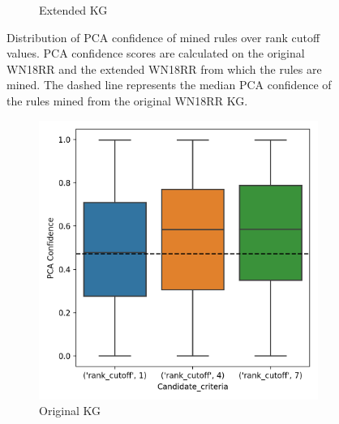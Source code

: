 \begin{figure}[h]
\begin{subfigure}{.5\textwidth}
  \caption{Extended KG}
  \label{fig:_PCA_rank_wn18rr_boxplot_sub}
\end{subfigure}
\caption{Distribution of PCA confidence of mined rules over rank cutoff values. PCA confidence scores are calculated on the original WN18RR and the extended WN18RR from which the rules are mined. The dashed line represents the median PCA confidence of the rules mined from the original WN18RR KG.}
\label{fig:PCA_rank_wn18rr_boxplot}
\end{figure}

\begin{figure}[h]
\centering
\begin{subfigure}{.5\textwidth}
  \centering
  \includegraphics[width=1\linewidth]{figures/results/ranks/PCA-rank_family.png}
  \caption{Original KG}
  \label{fig:models_rank_boxplot_sub}
\end{subfigure}%
\begin{subfigure}{.5\textwidth}
  \centering

\end{subfigure}
\end{figure}
